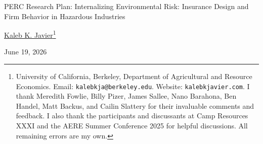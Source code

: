 \renewcommand{\thefootnote}{\fnsymbol{footnote}}

\thispagestyle{empty}

\begin{center}
\vspace*{3cm}

{\Large PERC Research Plan: Internalizing Environmental Risk: Insurance Design and Firm Behavior in Hazardous Industries}

\vspace{1cm}

{\normalsize \href{https://www.kalebkjavier.com}{Kaleb K. Javier}\footnote{University of California, Berkeley, Department of Agricultural and Resource Economics. Email: \texttt{kalebkja@berkeley.edu}. Website: \texttt{kalebkjavier.com}. I thank Meredith Fowlie, Billy Pizer, James Sallee, Nano Barahona, Ben Handel, Matt Backus, and Cailin Slattery for their invaluable comments and feedback. I also thank the participants and discussants at Camp Resources XXXI and the AERE Summer Conference 2025 for helpful discussions. All remaining errors are my own.}}

\vspace{0.2cm}

{\normalsize June 19, 2026}

\end{center}

\vspace{.2cm}


